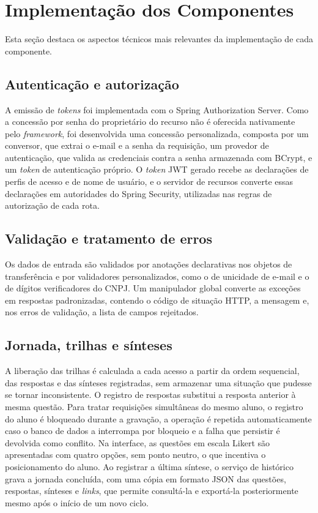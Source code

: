 \section{Implementação dos Componentes}

Esta seção destaca os aspectos técnicos mais relevantes da implementação de cada componente.

\subsection{Autenticação e autorização}

A emissão de \textit{tokens} foi implementada com o Spring Authorization Server. Como a concessão por senha do proprietário do recurso não é oferecida nativamente pelo \textit{framework}, foi desenvolvida uma concessão personalizada, composta por um conversor, que extrai o e-mail e a senha da requisição, um provedor de autenticação, que valida as credenciais contra a senha armazenada com BCrypt, e um \textit{token} de autenticação próprio. O \textit{token} JWT gerado recebe as declarações de perfis de acesso e de nome de usuário, e o servidor de recursos converte essas declarações em autoridades do Spring Security, utilizadas nas regras de autorização de cada rota.

\subsection{Validação e tratamento de erros}

Os dados de entrada são validados por anotações declarativas nos objetos de transferência e por validadores personalizados, como o de unicidade de e-mail e o de dígitos verificadores do CNPJ. Um manipulador global converte as exceções em respostas padronizadas, contendo o código de situação HTTP, a mensagem e, nos erros de validação, a lista de campos rejeitados.

\subsection{Jornada, trilhas e sínteses}

A liberação das trilhas é calculada a cada acesso a partir da ordem sequencial, das respostas e das sínteses registradas, sem armazenar uma situação que pudesse se tornar inconsistente. O registro de respostas substitui a resposta anterior à mesma questão. Para tratar requisições simultâneas do mesmo aluno, o registro do aluno é bloqueado durante a gravação, a operação é repetida automaticamente caso o banco de dados a interrompa por bloqueio e a falha que persistir é devolvida como conflito. Na interface, as questões em escala Likert são apresentadas com quatro opções, sem ponto neutro, o que incentiva o posicionamento do aluno. Ao registrar a última síntese, o serviço de histórico grava a jornada concluída, com uma cópia em formato JSON das questões, respostas, sínteses e \textit{links}, que permite consultá-la e exportá-la posteriormente mesmo após o início de um novo ciclo.

